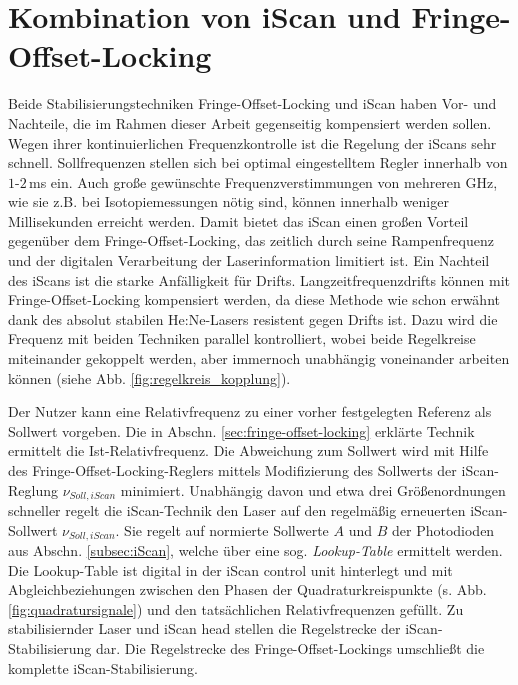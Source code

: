 \section{Kombination von iScan und
Fringe-Offset-Locking}\label{iscan_und_fringe-offset-locking}
Beide Stabilisierungstechniken Fringe-Offset-Locking und iScan haben Vor- und
Nachteile, die im Rahmen dieser Arbeit gegenseitig kompensiert werden sollen.
Wegen ihrer kontinuierlichen Frequenzkontrolle ist die Regelung der iScans sehr schnell. Sollfrequenzen stellen sich bei optimal eingestelltem Regler innerhalb
von $1$-$2\,$ms ein. Auch große gewünschte Frequenzverstimmungen von mehreren
GHz, wie sie z.B. bei Isotopiemessungen nötig sind, können innerhalb weniger
Millisekunden erreicht werden. Damit bietet das iScan einen großen
Vorteil gegenüber dem Fringe-Offset-Locking, das zeitlich durch seine Rampenfrequenz und der
digitalen Verarbeitung der Laserinformation limitiert ist.
Ein Nachteil des iScans ist die starke Anfälligkeit für Drifts.
Langzeitfrequenzdrifts können mit Fringe-Offset-Locking kompensiert werden, da
diese Methode wie schon erwähnt dank des absolut stabilen He:Ne-Lasers resistent
gegen Drifts ist. Dazu wird die Frequenz mit beiden Techniken parallel
kontrolliert, wobei beide Regelkreise miteinander gekoppelt werden, aber
immernoch unabhängig voneinander arbeiten können (siehe Abb.
\ref{fig:regelkreis_kopplung}).\par
Der Nutzer kann eine
Relativfrequenz zu einer vorher festgelegten Referenz als Sollwert vorgeben. Die
in Abschn. \ref{sec:fringe-offset-locking} erklärte Technik ermittelt die Ist-Relativfrequenz. Die Abweichung zum Sollwert
wird mit Hilfe des Fringe-Offset-Locking-Reglers mittels Modifizierung des
Sollwerts der iScan-Reglung $\nu_{Soll,iScan}$ minimiert. Unabhängig davon und
etwa drei Größenordnungen schneller regelt die iScan-Technik den Laser auf den
regelmäßig erneuerten iScan-Sollwert $\nu_{Soll,iScan}$. Sie regelt auf
normierte Sollwerte $A$ und $B$ der Photodioden aus Abschn. \ref{subsec:iScan},
welche über eine sog. \textit{Lookup-Table} ermittelt werden. Die Lookup-Table
ist digital in der iScan control unit hinterlegt und mit Abgleichbeziehungen
zwischen den Phasen der Quadraturkreispunkte (s. Abb. \ref{fig:quadratursignale}) und den
tatsächlichen Relativfrequenzen gefüllt. Zu stabilisiernder Laser und iScan head
stellen die Regelstrecke der iScan-Stabilisierung dar. Die Regelstrecke des
Fringe-Offset-Lockings umschließt die komplette iScan-Stabilisierung.\par
